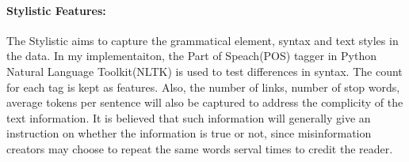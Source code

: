 \documentclass[11pt,a4paper]{article}
\begin{document}
\paragraph{Stylistic Features:}
The Stylistic aims to capture the grammatical element, syntax and text styles in the data. In my implementaiton, the Part of Speach(POS) tagger in Python Natural Language Toolkit(NLTK) is used to test differences in syntax. The count for each tag is kept as features. Also, the number of links, number of stop words, average tokens per sentence will also be captured to address the complicity of the text information. It is believed that such information will generally give an instruction on whether the information is true or not, since misinformation creators may choose to repeat the same words serval times to credit the reader.
\end{document}
